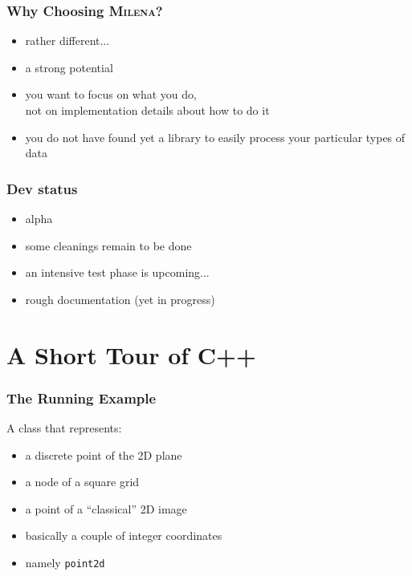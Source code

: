 \documentclass{beamer}
\newcommand{\cpp}{{C++}\xspace}
\newcommand{\code}[1]{{\scriptsize{\texttt{#1}}}\xspace}
\newcommand{\pointIId}{\code{point2d}}
\newcommand{\mln}{\textsc{Milena}\xspace}
\begin{document}
\begin{frame}%
  \frametitle{Why Choosing \mln?}

  \begin{itemize}
  \item rather different...
    \smallskip
  \item a strong potential
    \smallskip
  \item you want to focus on what you do,\\
    not on implementation details about how to do it
    \smallskip
  \item you do not have found yet a library to easily process your
    particular types of data
  \end{itemize}

\end{frame}



\begin{frame}%
  \frametitle{Dev status}

  \begin{itemize}
  \item alpha
  \item some cleanings remain to be done
  \item an intensive test phase is upcoming...
  \item rough documentation (yet in progress)
  \end{itemize}

\end{frame}



\section{A Short Tour of \cpp}

\begin{frame}
  \frametitle{The Running Example}

  A class that represents:
  \begin{itemize}
  \item a discrete point of the 2D plane
  \item a node of a square grid
  \item a point of a ``classical'' 2D image 
  \item basically a couple of integer coordinates
  \item namely \pointIId
  \end{itemize}

\end{frame}
\end{document}
